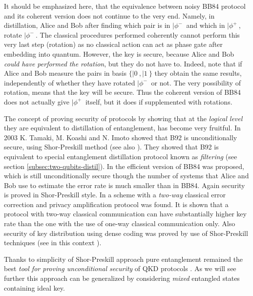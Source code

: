 \documentclass[twocolumn,aps,rmp]{revtex4}
\begin{document}
It should be emphasized here, that the equivalence between noisy BB84
protocol and its coherent version does not continue to the very
end. Namely, in distillation, Alice and Bob after finding which pair
is in $|\phi^-\>$ and which in $|\phi^+\>$, rotate $|\phi^-\>$. The
classical procedures performed coherently cannot perform this very
last step (rotation) as no classical action can act as phase gate
after embedding into quantum. However, the key is secure, because
Alice and Bob {\it could have performed the rotation}, but they do not
have to. Indeed, note that if Alice and Bob measure the pairs in basis
$\{|0\>,|1\>\}$ they obtain the same results, independently of whether
they have rotated $|\phi^-\>$ or not. The very possibility of
rotation, means that the key will be secure. Thus the coherent version
of BB84 does not actually give $|\phi^+\>$ itself, but it does if
supplemented with rotations.

The concept of proving security of \pmp protocols by showing that at
the {\it logical level} they are equivalent to distillation of
entanglement, has become very fruitful. In 2003 K. Tamaki, M. Koashi
and N. Imoto \cite{Tamaki03:secB92} showed that B92 is unconditionally
secure, using Shor-Preskill method (see also
\cite{TamakiLutkenhaus04}). They showed that B92 is equivalent to
special entanglement distillation protocol known as {\it filtering}
\cite{Gisin96,HHH1997-distill} (see section
\ref{subsec:two-qubits-distil}). In \cite{lca} the efficient version
of BB84 was proposed, which is still unconditionally secure though the
number of systems that Alice and Bob use to estimate the error rate is
much smaller than in BB84. Again security is proved in Shor-Preskill
style. In \cite{Gottesman-Lo} a \pmp scheme with a {\it two-way}
classical error correction and privacy amplification protocol was
found. It is shown that a protocol with two-way classical
communication can have substantially higher key rate than the one with
the use of one-way classical communication only.
Also security of key distribution using dense coding  \cite{LongLiu2002} was proved
by use of Shor-Preskill techniques \cite{ZhangWenLong2005} (see in this
context \cite{DegiovanniRCRBCC2003-dense-qkd,Wojcik-dense-qkd,RepToCommQDKD}).

Thanks to simplicity of Shor-Preskill approach pure entanglement
remained the best {\it tool for proving unconditional security} of QKD
protocols \cite{Crypt_ent_withent}.  As we will see further this approach can be
generalized by considering {\it mixed} entangled states containing
ideal key.
\end{document}
